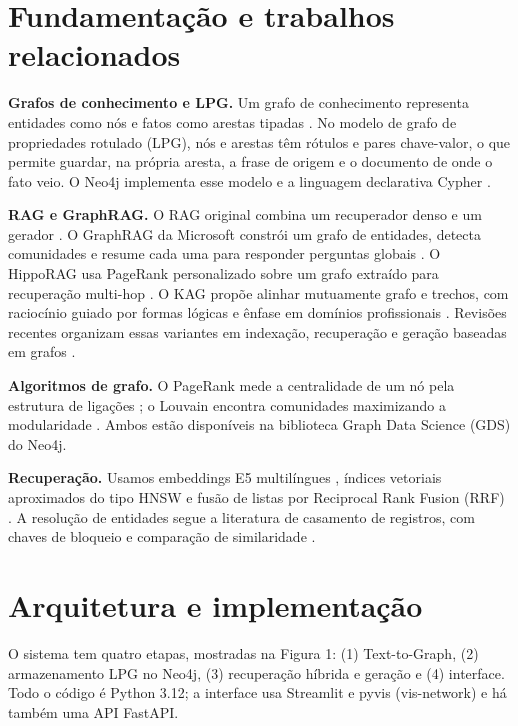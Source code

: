 \documentclass[12pt]{article}
\begin{document}
\section{Fundamentação e trabalhos relacionados}
\textbf{Grafos de conhecimento e LPG.} Um grafo de conhecimento representa entidades como nós e fatos como arestas tipadas \cite{hogan2021kg}. No modelo de grafo de propriedades rotulado (LPG), nós e arestas têm rótulos e pares chave-valor, o que permite guardar, na própria aresta, a frase de origem e o documento de onde o fato veio. O Neo4j implementa esse modelo e a linguagem declarativa Cypher \cite{francis2018cypher,robinson2015graph}.

\textbf{RAG e GraphRAG.} O RAG original combina um recuperador denso e um gerador \cite{lewis2020rag}. O GraphRAG da Microsoft constrói um grafo de entidades, detecta comunidades e resume cada uma para responder perguntas globais \cite{edge2024graphrag}. O HippoRAG usa PageRank personalizado sobre um grafo extraído para recuperação multi-hop \cite{gutierrez2024hipporag}. O KAG propõe alinhar mutuamente grafo e trechos, com raciocínio guiado por formas lógicas e ênfase em domínios profissionais \cite{liang2024kag}. Revisões recentes organizam essas variantes em indexação, recuperação e geração baseadas em grafos \cite{peng2024survey,pan2024unifying}.

\textbf{Algoritmos de grafo.} O PageRank mede a centralidade de um nó pela estrutura de ligações \cite{page1999pagerank}; o Louvain encontra comunidades maximizando a modularidade \cite{blondel2008louvain}. Ambos estão disponíveis na biblioteca Graph Data Science (GDS) do Neo4j.

\textbf{Recuperação.} Usamos embeddings E5 multilíngues \cite{wang2024me5}, índices vetoriais aproximados do tipo HNSW \cite{malkov2018hnsw} e fusão de listas por Reciprocal Rank Fusion (RRF) \cite{cormack2009rrf}. A resolução de entidades segue a literatura de casamento de registros, com chaves de bloqueio e comparação de similaridade \cite{christen2012data}.

\section{Arquitetura e implementação}
O sistema tem quatro etapas, mostradas na Figura 1: (1) Text-to-Graph, (2) armazenamento LPG no Neo4j, (3) recuperação híbrida e geração e (4) interface. Todo o código é Python 3.12; a interface usa Streamlit e pyvis (vis-network) e há também uma API FastAPI.
\end{document}
